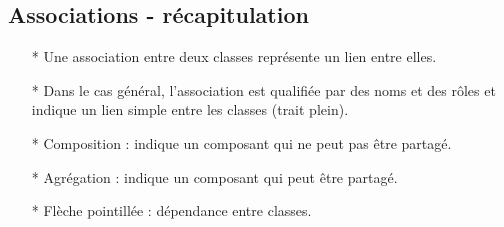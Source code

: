 \documentclass[12pt]{article}
\begin{document}
\subsection{Associations - récapitulation}
\begin{itemize}
	\item[* ] Une association entre deux classes représente un lien entre
	elles.
	\item[* ] Dans le cas général, l'association est qualifiée par des noms et des rôles
	et indique un lien simple entre les classes (trait plein).
	\item[* ] Composition : indique un composant qui ne peut pas être partagé.
	\item[* ] Agrégation : indique un composant qui peut être partagé.
	\item[* ] Flèche pointillée : dépendance entre classes.
\end{itemize}
\end{document}

